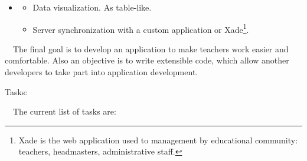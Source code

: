 \documentclass[a4paper]{article}
\begin{document}
\begin{itemize}
\item \begin{itemize}
\item Data visualization. As table-like.
\item Server synchronization with a custom application or
Xade\footnote{Xade is the web application used to management by
educational community: teacher{\textquotesingle}s, headmasters,
administrative staff.}.
\end{itemize}
\end{itemize}
\ \ The final goal is to develop an application to make
teacher{\textquotesingle}s work easier and comfortable. Also an
objective is to write extensible code, which allow another developers
to take part into application development.

Tasks:

\ \ The current list of tasks are:
\end{document}
